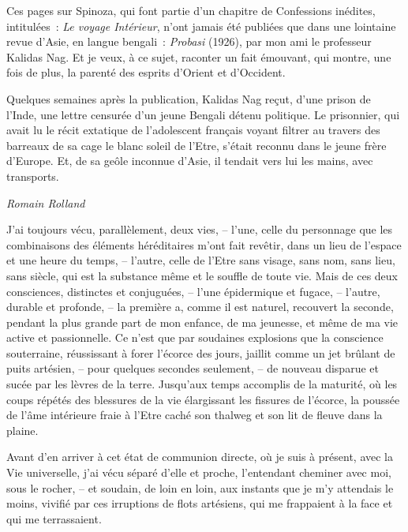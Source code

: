 \pagebreak
\thispagestyle{empty}

Ces pages sur Spinoza, qui font partie d'un chapitre de Confessions
inédites, intitulées~: \emph{Le voyage Intérieur}, n'ont jamais été
publiées que dans une lointaine revue d'Asie, en langue bengali~:
\emph{Probasi} (1926), par mon ami le professeur Kalidas Nag. Et je
veux, à ce sujet, raconter un fait émouvant, qui montre, une fois de
plus, la parenté des esprits d'Orient et d'Occident.

Quelques semaines après la publication, Kalidas Nag reçut, d'une prison
de l'Inde, une lettre censurée d'un jeune Bengali détenu politique. Le
prisonnier, qui avait lu le récit extatique de l'adolescent français
voyant filtrer au travers des barreaux de sa cage le blanc soleil de
l'Etre, s'était reconnu dans le jeune frère d'Europe. Et, de sa geôle
inconnue d'Asie, il tendait vers lui les mains, avec transports.

\begin{flushright}
\emph{Romain Rolland}
\end{flushright}

\pagebreak
\thispagestyle{empty}
\movetooddpage

J'ai toujours vécu, parallèlement, deux vies, -- l'une, celle du
personnage que les combinaisons des éléments héréditaires m'ont fait
revêtir, dans un lieu de l'espace et une heure du temps, -- l'autre,
celle de l'Etre sans visage, sans nom, sans lieu, sans siècle, qui est
la substance même et le souffle de toute vie. Mais de ces deux
consciences, distinctes et conjuguées, -- l'une épidermique et fugace,
-- l'autre, durable et profonde, -- la première a, comme il est naturel,
recouvert la seconde, pendant la plus grande part de mon enfance, de ma
jeunesse, et même de ma vie active et passionnelle. Ce n'est que par
soudaines explosions que la conscience souterraine, réussissant à forer
l'écorce des jours, jaillit comme un jet brûlant de puits artésien, --
pour quelques secondes seulement, -- de nouveau disparue et sucée par
les lèvres de la terre. Jusqu'aux temps accomplis de la maturité, où les
coups répétés des blessures de la vie élargissant les fissures de
l'écorce, la poussée de l'âme intérieure fraie à l'Etre caché son
thalweg et son lit de fleuve dans la plaine.

Avant d'en arriver à cet état de communion directe, où je suis à
présent, avec la Vie universelle, j'ai vécu séparé d'elle et proche,
l'entendant cheminer avec moi, sous le rocher, -- et soudain, de loin en
loin, aux instants que je m'y attendais le moins, vivifié par ces
irruptions de flots artésiens, qui me frappaient à la face et qui me
terrassaient.

